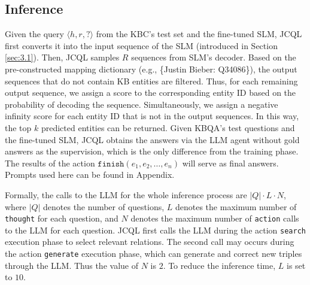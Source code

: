 \documentclass[11pt]{article}
\begin{document}
\subsection{Inference} \label{sec:3.4}
Given the query $\langle h, r, ?\rangle$ from the KBC's test set and the fine-tuned SLM, JCQL first converts it into the input sequence of the SLM (introduced in Section \ref{sec:3.1}). Then, JCQL samples $R$ sequences from SLM's decoder. Based on the pre-constructed mapping dictionary (e.g., \{Justin Bieber: Q34086\}), the output sequences that do not contain KB entities are filtered. Thus, for each remaining output sequence, we assign a score to the corresponding entity ID based on the probability of decoding the sequence. Simultaneously, we assign a negative infinity score for each entity ID that is not in the output sequences. In this way, the top $k$ predicted entities can be returned. 
Given KBQA's test questions and the fine-tuned SLM, JCQL obtains the answers via the LLM agent without gold answers as the supervision, which is the only difference from the training phase. The results of the action $\texttt{finish}(e_1, e_2, \dots, e_n)$ will serve as final answers. Prompts used here can be found in Appendix.

Formally, the calls to the LLM for the whole inference process are $|Q| \cdot L \cdot N$, where $|Q|$ denotes the number of questions, $L$ denotes the maximum number of \texttt{thought} for each question, and $N$ denotes the maximum number of \texttt{action} calls to the LLM for each question. JCQL first calls the LLM during the action \texttt{search} execution phase to select relevant relations. The second call may occurs during the action \texttt{generate} execution phase, which can generate and correct new triples through the LLM. Thus the value of $N$ is $2$. To reduce the inference time, $L$ is set to $10$. 
\end{document}
